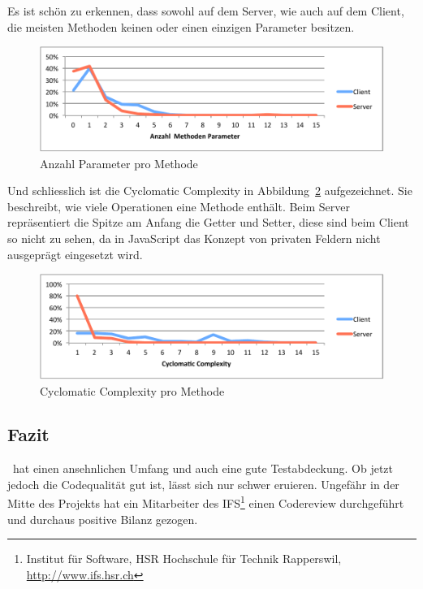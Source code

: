 	Es ist schön zu erkennen, dass sowohl auf dem Server, wie auch auf dem Client,
	die meisten Methoden keinen oder einen einzigen Parameter besitzen.
	\begin{figure}[H]
		\includegraphics[width=\textwidth]{projectPlan/media/img/methodComplexityParameterCount.pdf}
		\centering
		\caption{Anzahl Parameter pro Methode}
		\label{fig:methodComplexityParameterCount}
	\end{figure}
	Und schliesslich ist die Cyclomatic Complexity in Abbildung\ \ref{fig:methodComplexityCyclomaticComplexity} aufgezeichnet.
	Sie beschreibt, wie viele Operationen eine Methode enthält.
	Beim Server repräsentiert die Spitze am Anfang die Getter und Setter,
	diese sind beim Client so nicht zu sehen,
	da in JavaScript das Konzept von privaten Feldern nicht ausgeprägt eingesetzt wird.
	\begin{figure}[H]
		\includegraphics[width=\textwidth]{projectPlan/media/img/methodComplexityCyclomaticComplexity.pdf}
		\centering
		\caption{Cyclomatic Complexity pro Methode}
		\label{fig:methodComplexityCyclomaticComplexity}
	\end{figure}
	
	\subsection{Fazit}
		\eeppi\ hat einen ansehnlichen Umfang und auch eine gute Testabdeckung.
		Ob jetzt jedoch die Codequalität gut ist, lässt sich nur schwer eruieren.
		Ungefähr in der Mitte des Projekts hat ein Mitarbeiter des IFS\footnote{Institut für Software, HSR Hochschule für Technik Rapperswil, \url{http://www.ifs.hsr.ch}} einen Codereview durchgeführt und durchaus positive Bilanz gezogen.
		
